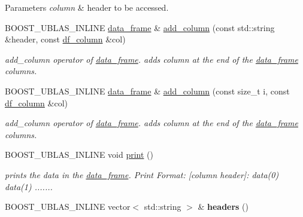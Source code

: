 \begin{DoxyParams}{Parameters}
{\em column} & header to be accessed. \\
\hline
\end{DoxyParams}
\begin{DoxyCompactItemize}
\item 
B\+O\+O\+S\+T\+\_\+\+U\+B\+L\+A\+S\+\_\+\+I\+N\+L\+I\+NE \hyperlink{classboost_1_1numeric_1_1ublas_1_1data__frame}{data\+\_\+frame} \& \hyperlink{classboost_1_1numeric_1_1ublas_1_1data__frame_a8f67aa27f8f340e8bfd42ce0f7713be0}{add\+\_\+column} (const std\+::string \&header, const \hyperlink{classboost_1_1numeric_1_1ublas_1_1df__column}{df\+\_\+column} \&col)
\begin{DoxyCompactList}\small\item\em add\+\_\+column operator of \hyperlink{classboost_1_1numeric_1_1ublas_1_1data__frame}{data\+\_\+frame}. adds column at the end of the \hyperlink{classboost_1_1numeric_1_1ublas_1_1data__frame}{data\+\_\+frame} columns. \end{DoxyCompactList}\item 
B\+O\+O\+S\+T\+\_\+\+U\+B\+L\+A\+S\+\_\+\+I\+N\+L\+I\+NE \hyperlink{classboost_1_1numeric_1_1ublas_1_1data__frame}{data\+\_\+frame} \& \hyperlink{classboost_1_1numeric_1_1ublas_1_1data__frame_a487209ed44384e2999d6a407160276e6}{add\+\_\+column} (const size\+\_\+t i, const \hyperlink{classboost_1_1numeric_1_1ublas_1_1df__column}{df\+\_\+column} \&col)
\begin{DoxyCompactList}\small\item\em add\+\_\+column operator of \hyperlink{classboost_1_1numeric_1_1ublas_1_1data__frame}{data\+\_\+frame}. adds column at the end of the \hyperlink{classboost_1_1numeric_1_1ublas_1_1data__frame}{data\+\_\+frame} columns. \end{DoxyCompactList}\item 
B\+O\+O\+S\+T\+\_\+\+U\+B\+L\+A\+S\+\_\+\+I\+N\+L\+I\+NE void \hyperlink{classboost_1_1numeric_1_1ublas_1_1data__frame_a2aae0aa66a1eadc3301b40cd104596c1}{print} ()\hypertarget{classboost_1_1numeric_1_1ublas_1_1data__frame_a2aae0aa66a1eadc3301b40cd104596c1}{}\label{classboost_1_1numeric_1_1ublas_1_1data__frame_a2aae0aa66a1eadc3301b40cd104596c1}

\begin{DoxyCompactList}\small\item\em prints the data in the \hyperlink{classboost_1_1numeric_1_1ublas_1_1data__frame}{data\+\_\+frame}. Print Format\+: \mbox{[}column header\mbox{]}\+: data(0) data(1) ....... \end{DoxyCompactList}\item 
B\+O\+O\+S\+T\+\_\+\+U\+B\+L\+A\+S\+\_\+\+I\+N\+L\+I\+NE vector$<$ std\+::string $>$ \& {\bfseries headers} ()\hypertarget{classboost_1_1numeric_1_1ublas_1_1data__frame_aff5e603e988e7b710a3df6104d706c12}{}\label{classboost_1_1numeric_1_1ublas_1_1data__frame_aff5e603e988e7b710a3df6104d706c12}


\end{DoxyCompactItemize}
